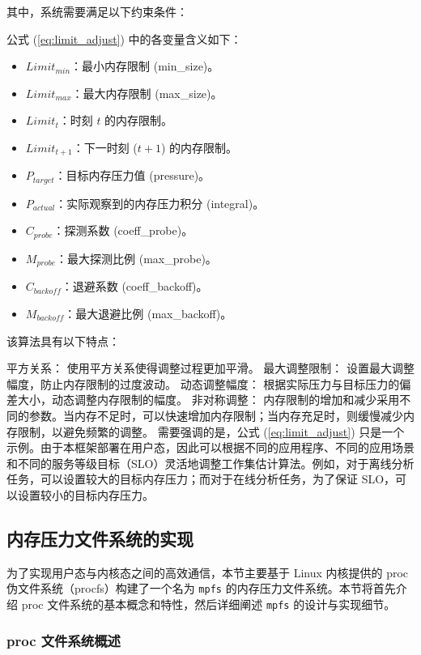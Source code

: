 其中，系统需要满足以下约束条件：

公式 (\ref{eq:limit_adjust}) 中的各变量含义如下：
\begin{itemize}
    \item \(Limit_{min}\)：最小内存限制 (min\_size)。
    \item \(Limit_{max}\)：最大内存限制 (max\_size)。
    \item \(Limit_t\)：时刻 \(t\) 的内存限制。
    \item \(Limit_{t+1}\)：下一时刻 (\(t+1\)) 的内存限制。
    \item \(P_{target}\)：目标内存压力值 (pressure)。
    \item \(P_{actual}\)：实际观察到的内存压力积分 (integral)。
    \item \(C_{probe}\)：探测系数 (coeff\_probe)。
    \item \(M_{probe}\)：最大探测比例 (max\_probe)。
    \item \(C_{backoff}\)：退避系数 (coeff\_backoff)。
    \item \(M_{backoff}\)：最大退避比例 (max\_backoff)。
\end{itemize}

该算法具有以下特点：

平方关系： 使用平方关系使得调整过程更加平滑。
最大调整限制： 设置最大调整幅度，防止内存限制的过度波动。
动态调整幅度： 根据实际压力与目标压力的偏差大小，动态调整内存限制的幅度。
非对称调整： 内存限制的增加和减少采用不同的参数。当内存不足时，可以快速增加内存限制；当内存充足时，则缓慢减少内存限制，以避免频繁的调整。
需要强调的是，公式 (\ref{eq:limit_adjust}) 只是一个示例。由于本框架部署在用户态，因此可以根据不同的应用程序、不同的应用场景和不同的服务等级目标（SLO）灵活地调整工作集估计算法。例如，对于离线分析任务，可以设置较大的目标内存压力；而对于在线分析任务，为了保证 SLO，可以设置较小的目标内存压力。



\subsection{内存压力文件系统的实现}
\label{sec:mpfs_implementation}

为了实现用户态与内核态之间的高效通信，本节主要基于 Linux 内核提供的 proc 伪文件系统（procfs）构建了一个名为 \texttt{mpfs} 的内存压力文件系统。本节将首先介绍 proc 文件系统的基本概念和特性，然后详细阐述 \texttt{mpfs} 的设计与实现细节。

\subsubsection{proc 文件系统概述}

